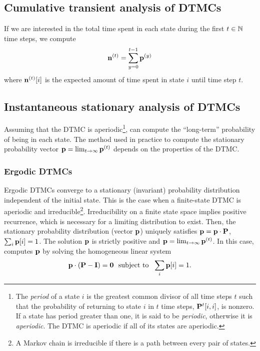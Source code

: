 \subsection{Cumulative transient analysis of DTMCs}
If we are interested in the total time spent in each state during the first
$t \in \Naturals$ time steps, we compute
\[
   \vn^{(t)} = \sum_{y=0}^{t-1} \vp^{(y)}
\]
where $\vn^{(t)}[i]$ is the expected amount of time spent in state $i$
until time step $t$.

\subsection{Instantaneous stationary analysis of DTMCs}
Assuming that the DTMC is aperiodic\footnote{ The \emph{period} of
a state $i$ is the greatest common divisor of all time steps $t$
such that the probability of returning to state $i$ in $t$ time
steps, $\P^t[i,i]$, is nonzero. If a state has period greater than
one, it is said to be \emph{periodic},
otherwise it is \emph{aperiodic}.
The DTMC is aperiodic if all of its states are
aperiodic.}, {\smart} can compute the ``long-term'' probability of
being in each state. The method used in practice to compute the
stationary probability vector
$\vp = \lim_{t \to\infty} \vp^{(t)}$
depends on the properties of the DTMC.

\subsubsection*{Ergodic DTMCs}

Ergodic DTMCs converge to a
stationary (invariant) probability distribution
independent of the initial state.  This is the case when a finite-state DTMC is aperiodic and
irreducible\footnote{ A
Markov chain is irreducible if there is a path between every pair
of states.}.  Irreducibility on a finite state space
implies positive recurrence, which is necessary for a limiting distribution to exist.
Then, the stationary probability distribution (vector
$\vp$) uniquely satisfies $\vp = \vp \cdot \P$,
$\sum_{i}\vp[i]=1$.  The solution $\vp$ is strictly positive and
$\vp = \lim_{t \to\infty} \vp^{(t)}$.  In this case, {\smart} computes
$\vp$ by solving the homogeneous linear system
\begin{equation}
  \vp \cdot (\P - \I) = \0 \ \mbox{ subject to }\ \sum_{i}\vp[i]=1.
  \label{LS:ergDTMC}
\end{equation}

